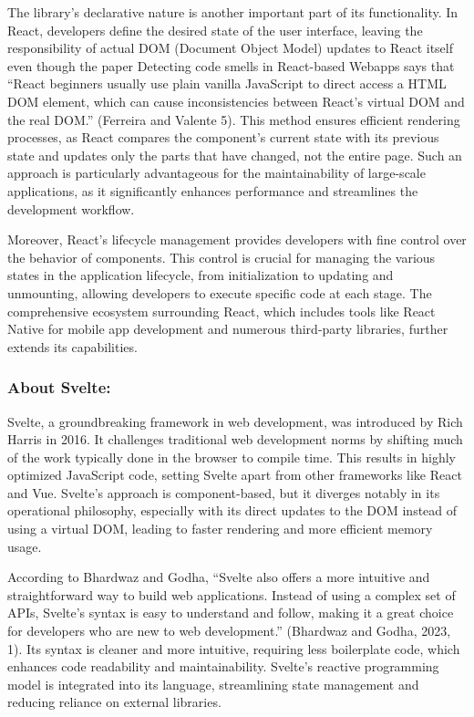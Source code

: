 The library's declarative nature is another important part of its functionality. In React, developers define the desired state of the user interface, leaving the responsibility of actual DOM (Document Object Model) updates to React itself even though the paper Detecting code smells in React-based Webapps says that “React beginners usually use plain vanilla JavaScript to direct access a HTML DOM element, which can cause inconsistencies between React’s virtual DOM and the real DOM.” (Ferreira and Valente 5). This method ensures efficient rendering processes, as React compares the component's current state with its previous state and updates only the parts that have changed, not the entire page. Such an approach is particularly advantageous for the maintainability of large-scale applications, as it significantly enhances performance and streamlines the development workflow.

Moreover, React's lifecycle management provides developers with fine control over the behavior of components. This control is crucial for managing the various states in the application lifecycle, from initialization to updating and unmounting, allowing developers to execute specific code at each stage. The comprehensive ecosystem surrounding React, which includes tools like React Native for mobile app development and numerous third-party libraries, further extends its capabilities.

\subsubsection{About Svelte:}

Svelte, a groundbreaking framework in web development, was introduced by Rich Harris in 2016. It challenges traditional web development norms by shifting much of the work typically done in the browser to compile time. This results in highly optimized JavaScript code, setting Svelte apart from other frameworks like React and Vue. Svelte's approach is component-based, but it diverges notably in its operational philosophy, especially with its direct updates to the DOM instead of using a virtual DOM, leading to faster rendering and more efficient memory usage.

According to Bhardwaz and Godha, “Svelte also offers a more intuitive and straightforward way to build web applications. Instead of using a complex set of APIs, Svelte's syntax is easy to understand and follow, making it a great choice for developers who are new to web development.” (Bhardwaz and Godha, 2023, 1). Its syntax is cleaner and more intuitive, requiring less boilerplate code, which enhances code readability and maintainability. Svelte's reactive programming model is integrated into its language, streamlining state management and reducing reliance on external libraries.

